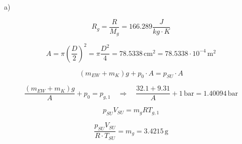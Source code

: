 a)

\[
R_g = \frac{R}{M_g} = 166.289 \frac{J}{kg \cdot K}
\]

\[
A = \pi \left( \frac{D}{2} \right)^2 = \pi \frac{D^2}{4} = 78.5338 \, \text{cm}^2 = 78.5338 \cdot 10^{-4} \, \text{m}^2
\]


\[
(m_{EW} + m_K) g + p_0 \cdot A = p_{SU} \cdot A
\]

\[
\frac{(m_{EW} + m_K) g}{A} + p_0 = p_{g,1} \quad \Rightarrow \quad \frac{32.1 + 9.31}{A} + 1 \, \text{bar} = 1.40094 \, \text{bar}
\]


\[
p_{SU} V_{SU} = m_g R T_{g,1}
\]

\[
\frac{p_{SU} V_{SU}}{R \cdot T_{SU}} = m_g = 3.4215 \, \text{g}
\]